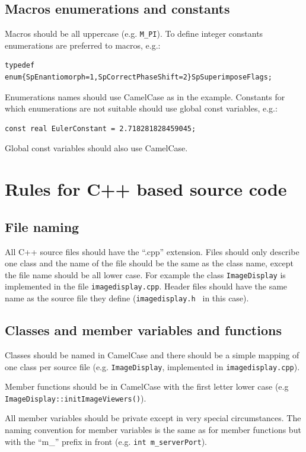 \documentclass[12pt]{article}
\newenvironment{sourcestyle}{}{}%
\begin{document}
\subsection{Macros enumerations and constants}
Macros should be all uppercase (e.g. {\tt M\_PI}). To define integer constants enumerations are preferred to macros, e.g.:
\begin{sourcestyle}
\begin{verbatim}
typedef enum{SpEnantiomorph=1,SpCorrectPhaseShift=2}SpSuperimposeFlags;
\end{verbatim}
\end{sourcestyle}
Enumerations names should use CamelCase as in the example. Constants for which enumerations are not suitable should use global const variables, e.g.:
\begin{sourcestyle}
\begin{verbatim}
const real EulerConstant = 2.718281828459045;
\end{verbatim}
\end{sourcestyle}
Global const variables should also use CamelCase.

\section{Rules for C++ based source code}
\subsection{File naming}
All C++ source files should have the ``.cpp'' extension. Files should only describe 
one class and the name of the file should be the same as the class name, except the file
name should be all lower case. For example the class {\tt ImageDisplay} is implemented in the file {\tt imagedisplay.cpp}. Header files should have the same name as the source file they define ({\tt imagedisplay.h } in this case).

\subsection{Classes and member variables and functions}
Classes should be named in CamelCase and there should be a simple mapping 
of one class per source file (e.g. {\tt ImageDisplay}, implemented in {\tt imagedisplay.cpp}).

Member functions should be in CamelCase with the first letter lower case (e.g {\tt ImageDisplay::initImageViewers()}).

All member variables should be private except in very special circumstances. 
The naming convention for member variables is the same as for member functions but with the ``m\_'' prefix in front (e.g. {\tt int m\_serverPort}).
\end{document}
